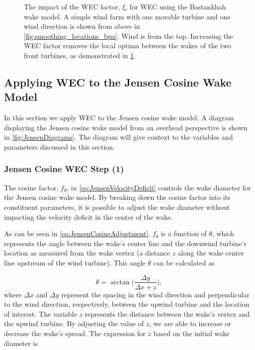 \documentclass[hidelinks,sort&compress,AMA,STIX1COL]{WileyNJD-v2}
\providecommand{\DIFaddendFL}{} %
\DeclareRobustCommand{\DIFaddendFL}{\DIFOaddendFL \let\includegraphics\DIFOincludegraphics} %
\begin{document}
\begin{figure}[h!]
\begin{subfigure}[t]{0.47\textwidth}
		\DIFaddendFL \caption{}
		\label{fig:smoothing_bpa_wec_d}
	\end{subfigure}
	\caption{The impact of the WEC factor, $\xi$, for WEC using the Bastankhah wake model. A simple wind farm with one movable turbine and one wind direction is shown from above in \cref{fig:smoothing_locations_bpa}. Wind is from the top. Increasing the WEC factor removes the local optima between the wakes of the two front turbines, as demonstrated in \cref{fig:smoothing_bpa_wec_d}.}
	\label{fig:wec_bpa_wec_d}
\end{figure}

\subsection{Applying WEC to the Jensen Cosine Wake Model}
In this section we apply WEC to the Jensen cosine wake model. A diagram displaying the Jensen cosine wake model from an overhead perspective is shown in \cref{fig:JensenDiagrams}. The diagram will give context to the variables and parameters discussed in this section.

\subsubsection{Jensen Cosine WEC Step (1)} 

The cosine factor, $f_\theta$, in \cref{eq:JensenVelocityDeficit} controls the wake diameter for the Jensen cosine wake model. By breaking down the cosine factor into its constituent parameters, it is possible to adjust the wake diameter without impacting the velocity deficit in the center of the wake.

As can be seen in \cref{eq:JensenCosineAdjustment}, $f_\theta$ is a function of $\theta$, which represents the angle between the wake's center line and the downwind turbine's location as measured from the wake vertex (a distance $z$ along the wake center line upstream of the wind turbine). This angle $\theta$ can be calculated as

\begin{equation}
	\theta = \arctan\Big( \frac{\Delta y}{\Delta x + z} \Big),
	\label{eq:Theta}
\end{equation}
%
where $\Delta x$ and $\Delta y$ represent the spacing in the wind direction and perpendicular to the wind direction, respectively, between the upwind turbine and the location of interest. The variable $z$ represents the distance between the wake's vertex and the upwind turbine. By adjusting the value of $z$, we are able to increase or decrease the wake's spread. The expression for $z$ based on the initial wake diameter is
\end{document}
